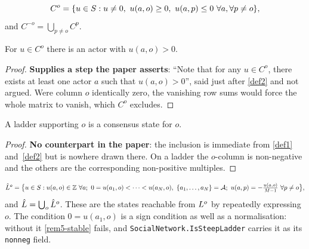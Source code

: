 \begin{definition}
  \label{def2}
  \leanok
  \[
    C^o = \{ u \in S : u \ne 0,\ u(a,o) \ge 0,\ u(a,p) \le 0
      \ \forall a, \forall p \ne o \},
  \]
  and $C^{-o} = \bigcup_{p \ne o} C^p$.
\end{definition}

\begin{lemma}
  \label{aux-consensus-pos}
  \leanok
  For $u \in C^o$ there is an actor with $u(a,o) > 0$.
\end{lemma}
\begin{proof}
  \leanok
  \textbf{Supplies a step the paper asserts}: ``Note that for any $u \in C^o$,
  there exists at least one actor $a$ such that $u(a,o) > 0$'', said just after
  \ref{def2} and not argued.  Were column $o$ identically zero, the vanishing
  row sums would force the whole matrix to vanish, which $C^o$ excludes.
\end{proof}

\begin{lemma}
  \label{aux-ladder-consensus}
  \leanok
  A ladder supporting $o$ is a consensus state for $o$.
\end{lemma}
\begin{proof}
  \leanok
  \textbf{No counterpart in the paper}: the inclusion is immediate from
  \ref{def1} and~\ref{def2} but is nowhere drawn there.  On a ladder the
  $o$-column is non-negative and the others are the corresponding non-positive
  multiples.
\end{proof}

\begin{definition}
  \label{def4}
  \leanok
  \[
    \hat{L}^o = \bigl\{ u \in S : u(a,o) \in \mathbb{Z}\ \forall a;\
      0 = u(a_1,o) < \dots < u(a_N,o),\ \{a_1,\dots,a_N\} = \mathcal{A};\
      u(a,p) = -\tfrac{u(a,o)}{M-1}\ \forall p \ne o \bigr\} ,
  \]
  and $\hat{L} = \bigcup_o \hat{L}^o$.  These are the states reachable from
  $L^o$ by repeatedly expressing $o$.  The condition $0 = u(a_1, o)$ is a
  sign condition as well as a normalisation: without it \ref{rem5-stable} fails,
  and \texttt{SocialNetwork.IsSteepLadder} carries it as its \texttt{nonneg}
  field.
\end{definition}

